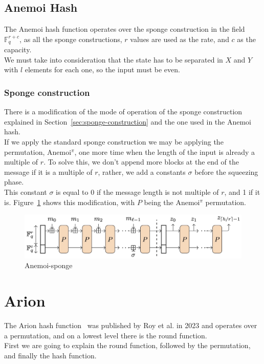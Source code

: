 \subsection*{Anemoi Hash}
The Anemoi hash function operates over the sponge construction in the field $\mathbb{F}_q^{r+c}$, as all the sponge constructions, $r$ values are used as the rate, and $c$ as the capacity.\\
We must take into consideration that the state has to be separated in $X$ and $Y$ with $l$ elements for each one, so the input must be even.

\subsubsection*{Sponge construction}
There is a modification of the mode of operation of the sponge construction explained in Section~\ref{sec:sponge-construction} and the one used in the Anemoi hash.\\
If we apply the standard sponge construction we may be applying the permutation, Anemoi$^\pi$, one more time when the length of the input is already a multiple of $r$. To solve this, we don't append more blocks at the end of the message if it is a multiple of $r$, rather, we add a constants $\sigma$ before the squeezing phase.\\
This constant $\sigma$ is equal to 0 if the message length is not multiple of $r$, and 1 if it is. Figure~\ref{fig:anemoi-sponge-mod} shows this modification, with $P$ being the Anemoi$^\pi$ permutation.
\begin{figure}[htbp]
    \centering
    \includegraphics[width=\textwidth]{graphics/anemoi-sponge-mod.png}
    \caption{Anemoi-sponge~\cite{bouvier2023new}}
    \label{fig:anemoi-sponge-mod}
\end{figure}

\section{Arion}
\label{sec:Arion}
The Arion hash function~\cite{roy2023arion} was published by Roy et al. in 2023 and operates over a permutation, and on a lowest level there is the round function.\\
First we are going to explain the round function, followed by the permutation, and finally the hash function.

